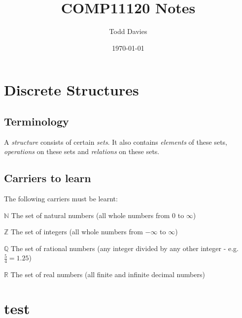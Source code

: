 \documentclass{article}
\author{Todd Davies}
\title{COMP11120 Notes}
\date{\today}
\begin{document}
\lhead{\today}

\maketitle

\section{Discrete Structures}

\subsection{Terminology}

A {\it structure} consists of certain {\it sets}. It also contains {\it elements} of these sets, {\it operations} on these sets and {\it relations} on these sets.

\subsection{Carriers to learn}

The following carriers must be learnt:

$\mathbb{N}$ The set of natural numbers (all whole numbers from $0$ to $\infty$)

$\mathbb{Z}$ The set of integers (all whole numbers from $-\infty$ to $\infty$)

$\mathbb{Q}$ The set of rational numbers (any integer divided by any other integer - e.g. $\frac{5}{4}=1.25$)

$\mathbb{R}$ The set of real numbers (all finite and infinite decimal numbers)

\section{test}
\end{document}
